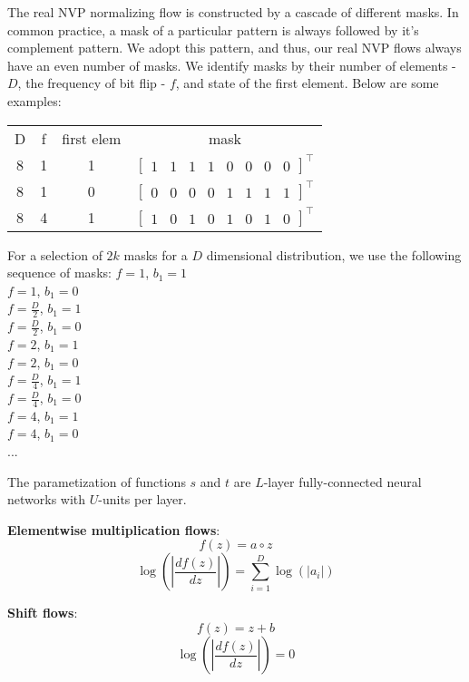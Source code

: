 \documentclass[11pt]{article}
\begin{document}
The real NVP normalizing flow is constructed by a cascade of different masks.  In common practice, a mask of a particular pattern is always followed by it's complement pattern.  We adopt this pattern, and thus, our real NVP flows always have an even number of masks.  We identify masks by their number of elements - $D$, the frequency of bit flip - $f$, and state of the first element.  Below are some examples:

\begin{center}
\begin{tabular}{c | c | c | c}
D & f & first elem & mask \\
8 & 1 & 1 & $\begin{bmatrix} 1 & 1 & 1 & 1 & 0 & 0 & 0 & 0 \end{bmatrix}^\top$ \\
8 & 1 & 0 & $\begin{bmatrix} 0 & 0 & 0 & 0 & 1 & 1 & 1 & 1 \end{bmatrix}^\top$ \\
8 & 4 & 1 & $\begin{bmatrix} 1 & 0 & 1 & 0 & 1 & 0 & 1 & 0 \end{bmatrix}^\top$ \\
\end{tabular}
\end{center}

For a selection of $2k$ masks for a $D$ dimensional distribution, we use the following sequence of masks:
$f=1$, $b_1=1$ \\
$f=1$, $b_1=0$ \\
$f=\frac{D}{2}$, $b_1=1$ \\
$f=\frac{D}{2}$, $b_1=0$ \\
$f=2$, $b_1=1$ \\
$f=2$, $b_1=0$ \\
$f=\frac{D}{4}$, $b_1=1$ \\
$f=\frac{D}{4}$, $b_1=0$ \\
$f=4$, $b_1=1$ \\
$f=4$, $b_1=0$ \\
...

The parametization of functions $s$ and $t$ are $L$-layer fully-connected neural networks with $U$-units per layer.

\textbf{Elementwise multiplication flows}: \\
\[ f(z) = a \circ z \]
\[\log (\left| \frac{d f(z)}{dz} \right|) = \sum_{i=1}^D \log (|a_i|) \]

\textbf{Shift flows}: \\
\[ f(z) = z + b \]
\[\log (\left| \frac{d f(z)}{dz} \right|) = 0\]
\end{document}
